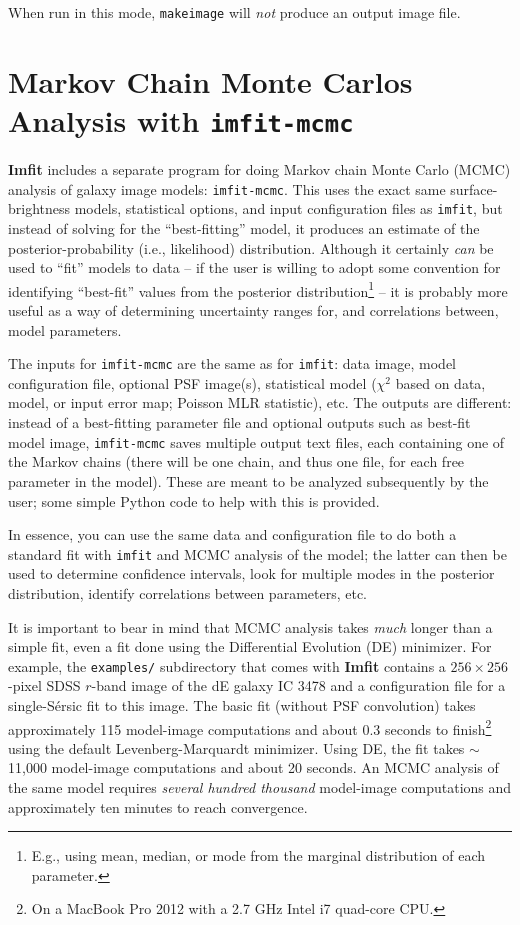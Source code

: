 \documentclass[10pt,a4paper,article]{memoir}
\newcommand{\Imfit}{\textbf{Imfit}}
\newcommand{\imfitprog}{\texttt{imfit}}
\newcommand{\imfitmcmc}{\texttt{imfit-mcmc}}
\newcommand{\makeimage}{\texttt{makeimage}}
\newcommand{\chisquare}{\ensuremath{\chi^{2}}}
\begin{document}
When run in this mode, \makeimage{} will \textit{not} produce an output image file.



\newpage

\chapter{Markov Chain Monte Carlos Analysis with \imfitmcmc}\label{sec:mcmc}

\Imfit{} includes a separate program for doing Markov
chain Monte Carlo (MCMC) analysis of galaxy image models: \imfitmcmc.
This uses the exact same surface-brightness models, statistical options,
and input configuration files as \imfitprog, but instead of solving for
the ``best-fitting'' model, it produces an estimate of the
posterior-probability (i.e., likelihood) distribution. Although it
certainly \textit{can} be used to ``fit'' models to data -- if the user
is willing to adopt some convention for identifying ``best-fit'' values
from the posterior distribution\footnote{E.g., using mean, median, or
mode from the marginal distribution of each parameter.} -- it is
probably more useful as a way of determining uncertainty ranges for, and
correlations between, model parameters.

The inputs for \imfitmcmc{} are the same as for \imfitprog: data image,
model configuration file, optional PSF image(s), statistical model
(\chisquare{} based on data, model, or input error map; Poisson MLR
statistic), etc. The outputs are different: instead of a best-fitting
parameter file and optional outputs such as best-fit model image,
\imfitmcmc{} saves multiple output text files, each containing one of
the Markov chains (there will be one chain, and thus one file, for each
free parameter in the model). These are meant to be analyzed
subsequently by the user; some simple Python code to help with this is
provided.

In essence, you can use the same data and configuration file to do both a
standard fit with \imfitprog{} and MCMC analysis of the model; the
latter can then be used to determine confidence intervals, look for
multiple modes in the posterior distribution, identify correlations
between parameters, etc.

It is important to bear in mind that MCMC analysis takes \textit{much}
longer than a simple fit, even a fit done using the Differential
Evolution (DE) minimizer. For example, the \texttt{examples/}
subdirectory that comes with \Imfit{} contains a $256 \times 256$-pixel
SDSS $r$-band image of the dE galaxy IC 3478 and a configuration file for a
single-S{\'e}rsic fit to this image. The basic fit (without PSF
convolution) takes approximately 115 model-image computations and about
0.3 seconds to finish\footnote{On a MacBook Pro 2012 with a 2.7 GHz
Intel i7 quad-core CPU.} using the default Levenberg-Marquardt
minimizer. Using DE, the fit takes $\sim$11,000 model-image computations
and about 20 seconds. An MCMC analysis of the same model requires
\textit{several hundred thousand} model-image computations and
approximately ten minutes to reach convergence.
\end{document}
